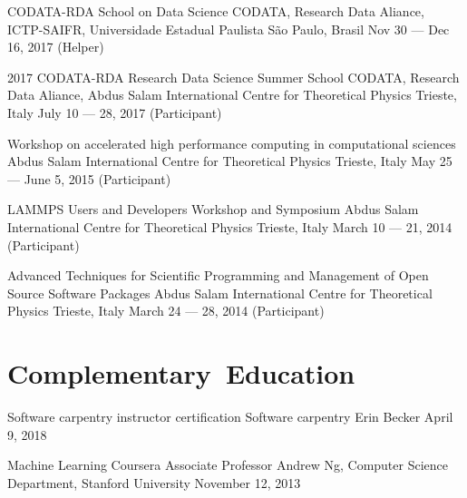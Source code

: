 \documentclass[12pt,english,letter,sans]{moderncv}
\begin{document}
        {CODATA-RDA School on Data Science}
        {CODATA, Research Data Aliance, ICTP-SAIFR, Universidade Estadual Paulista}
        {São Paulo, Brasil}
        {Nov 30 --- Dec 16, 2017}
        {(Helper)}

        {2017 CODATA-RDA Research Data Science Summer School}
        {CODATA, Research Data Aliance, Abdus Salam International Centre for Theoretical Physics}
        {Trieste, Italy}
        {July 10 --- 28, 2017}
        {(Participant)}

        {Workshop on accelerated high performance computing in computational sciences}
        {Abdus Salam International Centre for Theoretical Physics}
        {Trieste, Italy}
        {May 25 --- June 5, 2015}
        {(Participant)}

        {LAMMPS Users and Developers Workshop and Symposium}
        {Abdus Salam International Centre for Theoretical Physics}
        {Trieste, Italy}
        {March 10 --- 21, 2014}
        {(Participant)}

        {%
            Advanced Techniques for Scientific Programming and Management
            of Open Source Software Packages
        }
        {Abdus Salam International Centre for Theoretical Physics}
        {Trieste, Italy}
        {March 24 --- 28, 2014}
        {(Participant)}


\section{Complementary~Education}

        {Software carpentry instructor certification}
        {}
        {Software carpentry}
        {Erin Becker}
        {April 9, 2018}

        {Machine Learning}
        {}
        {Coursera}
        {Associate Professor Andrew Ng, Computer Science Department, Stanford University}
        {November 12, 2013}
\end{document}
